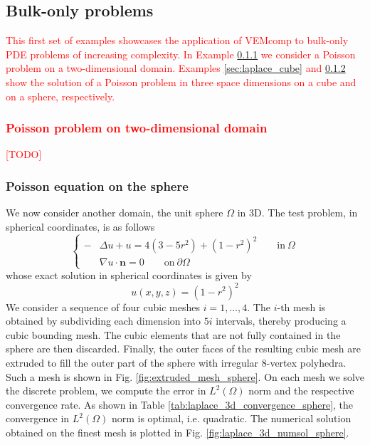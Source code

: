\documentclass[a4paper]{article}
\newcommand{\boldn}{\boldsymbol{n}}
\newcommand{\red}[1]{\textcolor{red}{#1}}
\begin{document}
\subsection{Bulk-only problems}
\red{This first set of examples showcases the application of VEMcomp to bulk-only PDE problems of increasing complexity. In Example \ref{sec:laplace_twodim} we consider a Poisson problem on a two-dimensional domain. Examples \ref{sec:laplace_cube} and \ref{sec:laplace_sphere} show the solution of a Poisson problem in three space dimensions on a cube and on a sphere, respectively.}

\subsubsection{\red{Poisson problem on two-dimensional domain}}
\label{sec:laplace_twodim}
\red{[TODO]}

 
\subsubsection{Poisson equation on the sphere}
\label{sec:laplace_sphere}
We now consider another domain, the unit sphere $\Omega$ in 3D. The test problem, in spherical coordinates, is as follows
\begin{equation}
\label{experiment_laplace_equation_3d_sphere}
\begin{cases}
-&\Delta u + u = 4(3-5r^2) + (1-r^2)^2 \qquad \text{in}\ \Omega\\
&\nabla u \cdot \boldn = 0 \qquad \text{on}\ \partial \Omega
\end{cases}
\end{equation}
whose exact solution in spherical coordinates is given by
\begin{equation}
u(x,y,z) = (1-r^2)^2
\end{equation}
We consider a sequence of four cubic meshes $i=1,\dots,4$. The $i$-th mesh is obtained by subdividing each dimension into $5i$ intervals, thereby producing a cubic bounding mesh.  The cubic elements that are not fully contained in the sphere are then discarded. Finally, the outer faces of the resulting cubic mesh are extruded to fill the outer part of the sphere with irregular $8$-vertex polyhedra.  Such a mesh is shown in Fig.  \ref{fig:extruded_mesh_sphere}. On each mesh we solve the discrete problem,  we compute the error in $L^2(\Omega)$ norm and the respective convergence rate. As shown in Table \ref{tab:laplace_3d_convergence_sphere}, the convergence in $L^2(\Omega)$ norm is optimal, i.e. quadratic. The numerical solution obtained on the finest mesh is plotted in Fig.  \ref{fig:laplace_3d_numsol_sphere}.
\end{document}

